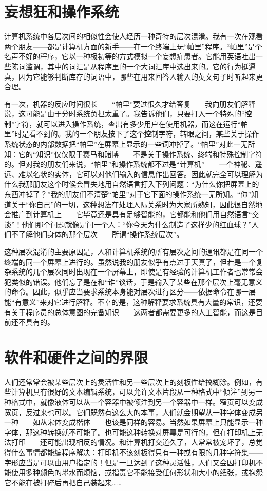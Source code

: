 \section{妄想狂和操作系统}

计算机系统中各层次间的相似性会使人经历一种奇特的层次混淆。我有一次在观看两个朋友——都是计算机方面的新手——在一个终端上玩“帕里”程序。“帕里”是个名声不好的程序，它以一种极初等的方式模拟一个妄想症患者。它能用英语吐出一些陈词滥调，其中的词汇是从程序里的一个大词汇库中选出来的。它的行为挺逼真，因为它能够判断库存的词语中，哪些在用来回答人输入的英文句子时听起来更合理。

有一次，机器的反应时间很长——“帕里”要过很久才给答复——我向朋友们解释说，这可能是由于分时系统负担太重了。我告诉他们，只要打入一个特殊的“控制”字符，就可以进入操作系统，查出有多少用户在使用机器，而这在运行“帕里”时是看不到的。我的一个朋友按下了这个控制字符，转眼之间，某些关于操作系统状态的内部数据把“帕里”在屏幕上显示的一些词冲掉了。“帕里”对此一无所知：它的“知识”仅仅限于赛马和赌博——不是关于操作系统、终端和特殊控制字符的。但对我的朋友们来说，“帕里”和操作系统都不过是“计算机”——一个神秘、遥远、难以名状的实体，它可以对他们输入的信息作出回答。因此就完全可以理解为什么我那朋友这个时候会冒失地用自然语言打入下列问题：“为什么你把屏幕上的东西冲掉了？”我的朋友们不清楚“帕里”对于它下面的操作系统一无所知。“你”知道关于“你自己”的一切，这种想法在处理人际关系时为大家所熟知，因此很自然地会推广到计算机上——它毕竟还是具有足够智能的，它都能和他们用自然语言“交谈”！他们那个问题就像是问一个人：“你今天为什么制造了这样少的红血球？”人们不了解他们身体的那个层次——所谓“操作系统层次”。

这种层次混淆的主要原因是，人和计算机系统的所有层次之间的通讯都是在同一个终端的同一个屏幕上进行的。虽然说我的朋友似乎有点过于天真了，但若是一个复杂系统的几个层次同时出现在一个屏幕上，即使是有经验的计算机工作者也常常会犯类似的错误。他们忘了是在和“谁”谈话，于是输入了某些在那个层次上毫无意义的命令。因此，似乎应当要求系统本身能对层次进行区分——依据命令在哪一层能“有意义”来对它进行解释。不幸的是，这种解释要求系统具有大量的常识，还要有关于程序员的总体意图的完备知识——这两者都需要更多的人工智能，而这是目前还不具有的。

\section{软件和硬件之间的界限}

人们还常常会被某些层次上的灵活性和另一些层次上的刻板性给搞糊涂。例如，有些计算机具有很好的文本编辑系统，可以允许文本片段从一种格式中“倾注”到另一种格式中，就像液体可以从一个容器中被倾注到另一个容器中一样。窄页可以变成宽页，反过来也可以。它们既然有这么大的本事，人们就会期望从一种字体变成另一种——如从宋体变成楷体——也该是同样的容易。当然如果屏幕上只能显示一种字体，那这种转换就不可能了。也可能这种转换对屏幕是可行的，但在打印机上无法打印——还可能出现相反的情况。和计算机打交道久了，人常常被宠坏了，总觉得什么事情都能编程序解决：打印机不该刻板得只有一种或有限的几种字符集——字形应当是可以由用户指定的！但是一旦达到了这种灵活性，人们又会因打印机不能使用多种颜色的墨水而烦恼，或指责它不能接受任何形状和大小的纸张，或抱怨它不能在被打碎后再把自己装起来……

